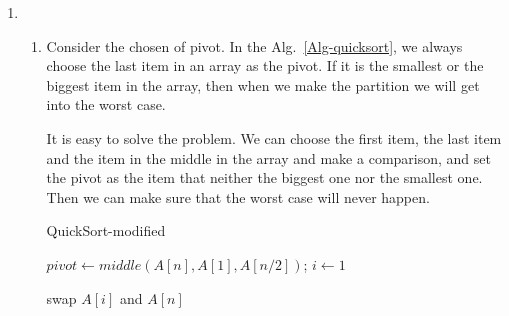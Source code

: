 \documentclass[12pt,a4paper]{article}
\makeatletter
\newtheorem*{solution}{Solution}
\theoremstyle{definition}
\renewenvironment{solution}[1][Solution] {\par\pushQED{\qed}\normalfont\topsep6\p@\@plus6\p@\relax\trivlist\item[\hskip\labelsep\bfseries#1\@addpunct{.}]\ignorespaces}{\popQED\endtrivlist\@endpefalse} \makeatother
\makeatother
\begin{document}
\begin{enumerate}
\begin{solution}
\begin{enumerate}
        \item Consider the chosen of pivot. In the Alg.~\ref{Alg-quicksort}, we always choose the last item in an array as the pivot. If it is the smallest or the biggest item in the array, then when we make the partition we will get into the worst case.
        
        It is easy to solve the problem. We can choose the first item, the last item and the item in the middle in the array and make a comparison, and set the pivot as the item that neither the biggest one nor the smallest one. Then we can make sure that the worst case will never happen.
        \newpage
        \begin{algorithm}[htbp]
		
		\BlankLine
		\caption{QuickSort-modified}\label{Alg-quicksort-modified}
		
		
		$pivot \leftarrow middle(A[n],A[1],A[n/2])$; $i \leftarrow 1$\;
		
		swap $A[i]$ and $A[n]$\;
	\end{algorithm}
        
    \end{enumerate}
    
    \end{solution}


\end{enumerate}
\end{document}
